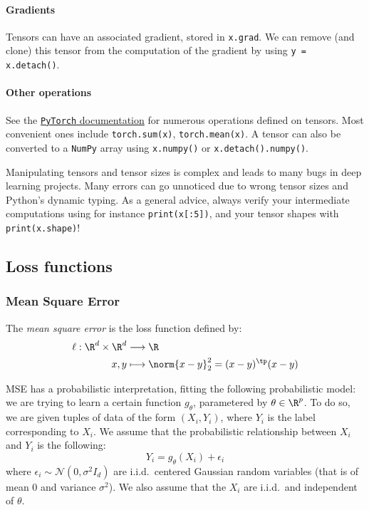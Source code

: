 \paragraph*{Gradients}
Tensors can have an associated gradient, stored in \texttt{x.grad}. We can remove (and clone) this tensor from the computation of the gradient by using \texttt{y = x.detach()}.

\paragraph*{Other operations}
See the \href{https://pytorch.org/docs/stable/tensors.html}{\texttt{PyTorch} documentation} for numerous operations defined on tensors. Most convenient ones include \texttt{torch.sum(x)}, \texttt{torch.mean(x)}. A tensor can also be converted to a \texttt{NumPy} array using \texttt{x.numpy()} or \texttt{x.detach().numpy()}.

Manipulating tensors and tensor sizes is complex and leads to many bugs in deep learning projects. Many errors can go unnoticed due to wrong tensor sizes and Python's dynamic typing. As a general advice, always verify your intermediate computations using for instance \texttt{print(x[:5])}, and your tensor shapes with \texttt{print(x.shape)}!

\subsection{Loss functions}
\subsubsection{Mean Square Error}
\begin{definition}
    The \emph{mean square error} is the loss function defined by:
    \begin{equation*}
        \begin{aligned}
            \ell : \R^d\times\R^d&\longrightarrow\R\\
            x, y&\longmapsto \norm{x-y}_2^2 = (x-y)^\tp(x-y)
        \end{aligned}
    \end{equation*}
\end{definition}

MSE has a probabilistic interpretation, fitting the following probabilistic model: we are trying to learn a certain function $g_\theta$, parametered by $\theta\in\R^p$. To do so, we are given tuples of data of the form $(X_i, Y_i)$, where $Y_i$ is the label corresponding to $X_i$. We assume that the probabilistic relationship between $X_i$ and $Y_i$ is the following:
\begin{equation*}
    Y_i=g_\theta(X_i)+\epsilon_i
\end{equation*}
where $\epsilon_i\sim\mathcal{N}(0,\sigma^2I_d)$ are i.i.d.~centered Gaussian random variables (that is of mean 0 and variance $\sigma^2$). We also assume that the $X_i$ are i.i.d.~and independent of $\theta$.

